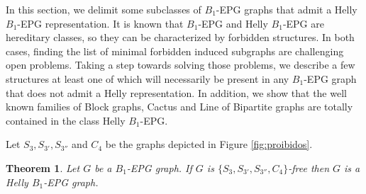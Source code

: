 \documentclass[9pt]{entcs}
\newtheorem{teo}{Theorem}[section]
\begin{document}
In this section, we delimit some  subclasses of $B_1$-EPG graphs that admit a Helly $B_1$-EPG representation. It is known that $B_1$-EPG and Helly $B_1$-EPG 
are hereditary classes, so they can  be characterized by forbidden structures. 
In both cases, finding the list of minimal forbidden induced subgraphs are challenging open problems.
Taking a step towards solving
those problems,  we describe a few structures %
at least one of which will  necessarily be present in  any $B_1$-EPG graph that does not admit a Helly representation. 
In addition,
we show that the well known families of Block graphs, Cactus and Line of Bipartite graphs are totally contained in the class Helly $B_1$-EPG.




Let $S_{3}, S_{3'}, S_{3''}$ and $ C_{4}$ be the graphs depicted in Figure \ref{fig:proibidos}. 



\begin{teo}
\label{lem:chordalDiamondFree}
Let $G$ be a $B_1$-EPG graph. If $G$ is  $\{S_{3}, S_{3'}, S_{3''}, C_{4}\}$-free then $G$  is a Helly $B_1$-EPG graph.
\end{teo}
\end{document}
